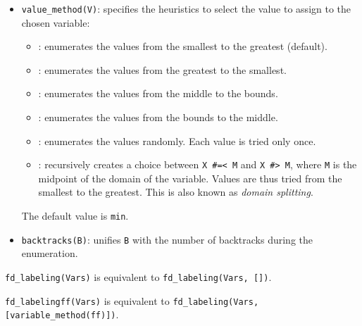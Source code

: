 \begin{itemize}
\item {}\texttt{value\_method(V)}: specifies the heuristics
to select the value to assign to the chosen variable:

\begin{itemize}

\item {}: enumerates the values from the smallest to the greatest
(default).

\item {}: enumerates the values from the greatest to the smallest.

\item {}: enumerates the values from the middle to the bounds.

\item {}: enumerates the values from the bounds to the middle.

\item {}: enumerates the values randomly. Each value is tried
  only once.

\item {}: recursively creates a choice between \texttt{X \#=<
    M} and \texttt{X \#> M}, where \texttt{M} is the midpoint of the
  domain of the variable. Values are thus tried from the smallest to the
  greatest. This is also known as \textit{domain splitting}.

\end{itemize}

\BL The default value is \texttt{min}.

\item {}\texttt{backtracks(B)}: unifies \texttt{B} with the
number of backtracks during the enumeration.

\end{itemize}

\texttt{fd\_labeling(Vars)} is equivalent to \texttt{fd\_labeling(Vars,
[])}.

\texttt{fd\_labelingff(Vars)} is equivalent to \texttt{fd\_labeling(Vars,
[variable\_method(ff)])}.

